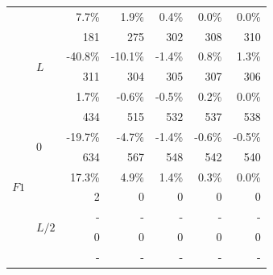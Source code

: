 \begin{figure}[p]
\begin{fullpage}
\begin{tabularx}{0.6\textwidth}{@{} XX rrrrr@{}}
&&{\color{black}\scriptsize7.7\%}&{\color{black}\scriptsize1.9\%}&{\color{black}\scriptsize0.4\%}&{\color{black}\scriptsize0.0\%}&{\color{black}\scriptsize0.0\%}\\\cmidrule[0.5\cmidrulewidth]{2-7}
&\multirow{4}{*}{$L$}&{\color{Tblue}\normalsize 181}&{\color{Tblue}\normalsize 275}&{\color{Tblue}\normalsize 302}&{\color{Tblue}\normalsize 308}&{\color{Tblue}\normalsize 310}\\
&&{\color{Tblue}\scriptsize-40.8\%}&{\color{Tblue}\scriptsize-10.1\%}&{\color{Tblue}\scriptsize-1.4\%}&{\color{Tblue}\scriptsize0.8\%}&{\color{Tblue}\scriptsize1.3\%}\\
&&{\color{black}\normalsize 311}&{\color{black}\normalsize 304}&{\color{black}\normalsize 305}&{\color{black}\normalsize 307}&{\color{black}\normalsize 306}\\
&&{\color{black}\scriptsize1.7\%}&{\color{black}\scriptsize-0.6\%}&{\color{black}\scriptsize-0.5\%}&{\color{black}\scriptsize0.2\%}&{\color{black}\scriptsize0.0\%}\\\midrule
\multirow{12}{*}{$F1$}&\multirow{4}{*}{$0$}&{\color{Tblue}\normalsize 434}&{\color{Tblue}\normalsize 515}&{\color{Tblue}\normalsize 532}&{\color{Tblue}\normalsize 537}&{\color{Tblue}\normalsize 538}\\
&&{\color{Tblue}\scriptsize-19.7\%}&{\color{Tblue}\scriptsize-4.7\%}&{\color{Tblue}\scriptsize-1.4\%}&{\color{Tblue}\scriptsize-0.6\%}&{\color{Tblue}\scriptsize-0.5\%}\\
&&{\color{black}\normalsize 634}&{\color{black}\normalsize 567}&{\color{black}\normalsize 548}&{\color{black}\normalsize 542}&{\color{black}\normalsize 540}\\
&&{\color{black}\scriptsize17.3\%}&{\color{black}\scriptsize4.9\%}&{\color{black}\scriptsize1.4\%}&{\color{black}\scriptsize0.3\%}&{\color{black}\scriptsize0.0\%}\\\cmidrule[0.5\cmidrulewidth]{2-7}
&\multirow{4}{*}{$L/2$}&{\color{Tblue}\normalsize 2}&{\color{Tblue}\normalsize 0}&{\color{Tblue}\normalsize 0}&{\color{Tblue}\normalsize 0}&{\color{Tblue}\normalsize 0}\\
&&{\color{Tblue}\scriptsize-}&{\color{Tblue}\scriptsize-}&{\color{Tblue}\scriptsize-}&{\color{Tblue}\scriptsize-}&{\color{Tblue}\scriptsize-}\\
&&{\color{black}\normalsize 0}&{\color{black}\normalsize 0}&{\color{black}\normalsize 0}&{\color{black}\normalsize 0}&{\color{black}\normalsize 0}\\
&&{\color{black}\scriptsize-}&{\color{black}\scriptsize-}&{\color{black}\scriptsize-}&{\color{black}\scriptsize-}&{\color{black}\scriptsize-}\\\cmidrule[0.5\cmidrulewidth]{2-7}

\end{tabularx}
\end{fullpage}
\end{figure}
